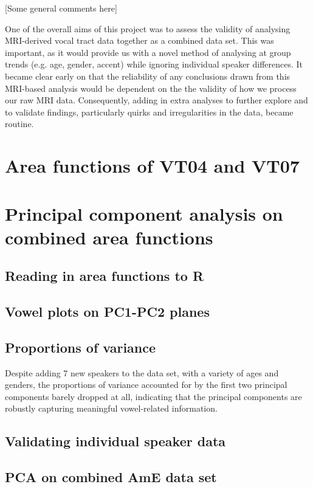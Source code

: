 [Some general comments here]

One of the overall aims of this project was to assess the validity of analysing MRI-derived vocal tract data together as a combined data set. This was important, as it would provide us with a novel method of analysing at group trends (e.g. age, gender, accent) while ignoring individual speaker differences. It became clear early on that the reliability of any conclusions drawn from this MRI-based analysis would be dependent on the the validity of how we process our raw MRI data. Consequently, adding in extra analyses to further explore and to validate findings, particularly quirks and irregularities in the data, became routine.

\section{Area functions of VT04 and VT07}

\section{Principal component analysis on combined area functions}

\subsection{Reading in area functions to R}

\subsection{Vowel plots on PC1-PC2 planes}

\subsection{Proportions of variance}

Despite adding 7 new speakers to the data set, with a variety of ages and genders, the proportions of variance accounted for by the first two principal components barely dropped at all, indicating that the principal components are robustly capturing meaningful vowel-related information.

\subsection{Validating individual speaker data}

\subsection{PCA on combined AmE data set}

